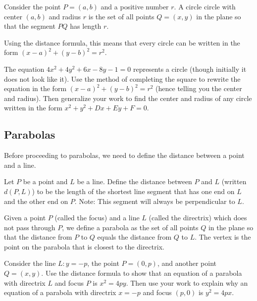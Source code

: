 \begin{definition}
Consider the point $P=(a,b)$ and a positive number $r.$ A circle 
circle with center $(a,b)$ and radius $r$ is
the set of all points $Q=(x,y)$ in the plane so that the segment $PQ$ has length $r$. 
\end{definition}

Using the distance formula, this means that every circle can be written in the form $(x-a)^2+(y-b)^2=r^2$. 

\begin{problem} 
The equation $4x^2+4y^2+6x-8y-1=0$ represents a circle (though initially it does not look like it). Use the method of completing the square to rewrite the equation in the form
$(x-a)^2 + (y-b)^2 = r^2$ (hence telling you the center and radius). Then generalize
your work to find the center and radius of any circle written in the form $x^2+y^2+Dx+Ey+F=0$.
\end{problem}

\subsection{Parabolas}
Before proceeding to parabolas, we need to define the distance between a point and a line.

\begin{definition}
Let $P$ be a point and $L$ be a line.  Define the distance between $P$ and $L$ (written
$d(P,L)$) to be the length of the shortest line segment that has one end on $L$ and the other end on $P$. Note: This segment will always be perpendicular to $L$.
\end{definition}

\begin{definition}
Given a point $P$ (called the focus) and a line $L$ (called the directrix) which does not pass through $P$, we define a parabola as the set of all points $Q$ in the plane so that the distance from $P$ to $Q$ equals the distance from $Q$ to $L$. 
The vertex is the point on the parabola that is closest to the directrix.
\end{definition}

\begin{problem}  
%
Consider the line $L:y=-p$, the point $P=(0,p)$, and another point $Q=(x,y)$.  Use the distance formula to show that an equation of a parabola with directrix $L$ and focus $P$ is $x^2=4py$.
Then use your work to explain why an equation of a parabola with directrix $x=-p$ and focus $(p,0)$ is $y^2=4px$. 
\end{problem}

